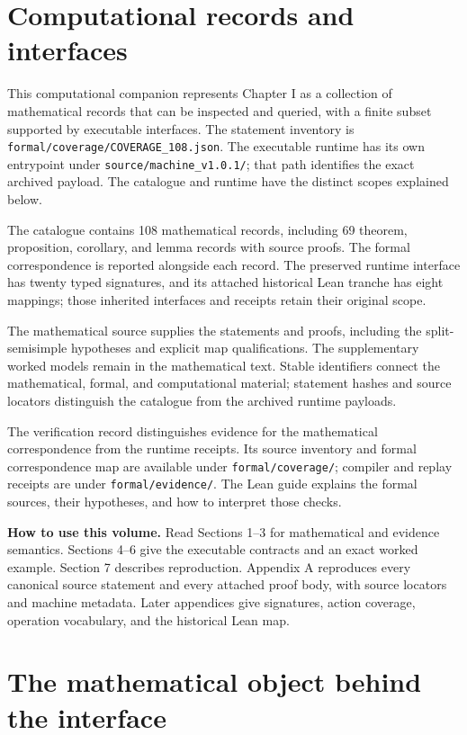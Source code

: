 \documentclass[a4paper,11pt]{article}
\begin{document}
\KomorebiCover


\section*{Computational records and interfaces}
This computational companion represents Chapter I as a collection of mathematical records that can be inspected and queried, with a finite subset supported by executable interfaces. The statement inventory is \nolinkurl{formal/coverage/COVERAGE_108.json}. The executable runtime has its own entrypoint under \nolinkurl{source/machine_v1.0.1/}; that path identifies the exact archived payload. The catalogue and runtime have the distinct scopes explained below.

The catalogue contains 108 mathematical records, including 69 theorem, proposition, corollary, and lemma records with source proofs. The formal correspondence is reported alongside each record. The preserved runtime interface has twenty typed signatures, and its attached historical Lean tranche has eight mappings; those inherited interfaces and receipts retain their original scope.

The mathematical source supplies the statements and proofs, including the split-semisimple hypotheses and explicit map qualifications. The supplementary worked models remain in the mathematical text. Stable identifiers connect the mathematical, formal, and computational material; statement hashes and source locators distinguish the catalogue from the archived runtime payloads.

The verification record distinguishes evidence for the mathematical correspondence from the runtime receipts. Its source inventory and formal correspondence map are available under \nolinkurl{formal/coverage/}; compiler and replay receipts are under \nolinkurl{formal/evidence/}. The Lean guide explains the formal sources, their hypotheses, and how to interpret those checks.

\textbf{How to use this volume.} Read Sections 1--3 for mathematical and evidence semantics. Sections 4--6 give the executable contracts and an exact worked example. Section 7 describes reproduction. Appendix A reproduces every canonical source statement and every attached proof body, with source locators and machine metadata. Later appendices give signatures, action coverage, operation vocabulary, and the historical Lean map.
\clearpage\tableofcontents\clearpage
\section{The mathematical object behind the interface}
\end{document}

